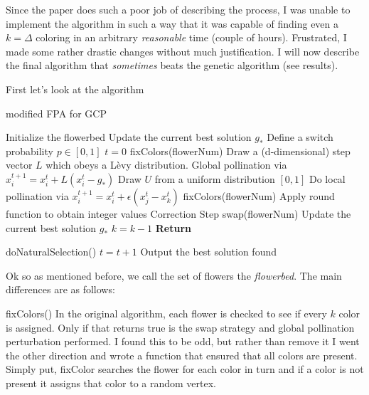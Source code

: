 Since the paper does such a poor job of describing the process, I was unable to implement the algorithm in such a way that it was capable of finding even a $k = \Delta$ coloring in an arbitrary \emph{reasonable} time (couple of hours). Frustrated, I made some rather drastic changes without much justification. I will now describe the final algorithm that \emph{sometimes} beats the genetic algorithm (see results).

First let's look at the algorithm

\begin{algorithm}[H]
    \caption{modified FPA for GCP}
    \label{FPA2}
    \begin{algorithmic}[1] %
         			
			\State Initialize the flowerbed
			\State Update the current best solution $g_*$
			\State Define a switch probability $p \in [0,1]$
			\State $t=0$
					\State fixColors(flowerNum)
					 
						\State Draw a (d-dimensional) step vector $L$ which obeys a L\`evy distribution.
						\State Global pollination via $x_i^{t+1} = x_i^{t} + L(x_i^{t} - g_*)$
					\Else
						\State Draw $U$ from a uniform distribution $[0,1]$
						\State Do local pollination via $x_i^{t+1} = x_i^{t} + \epsilon(x_j^{t} - x_k^{t})$
					\EndIf
					\State fixColors(flowerNum)
					\State Apply round function to obtain integer values
					\State Correction Step 
					 
						\State swap(flowerNum)
					\EndFor
				\EndFor
				\State Update the current best solution $g_*$
					\State $k = k-1$
					\State \textbf{Return}
				\EndIf

				doNaturalSelection()
				\State $t = t+1$
			\EndWhile
			\State Output the best solution found
		\EndProcedure
    \end{algorithmic}
\end{algorithm}

Ok so as mentioned before, we call the set of flowers the \emph{flowerbed}. The main differences are as follows:

fixColors()
In the original algorithm, each flower is checked to see if every $k$ color is assigned. Only if that returns true is the swap strategy and global pollination perturbation performed. I found this to be odd, but rather than remove it I went the other direction and wrote a function that ensured that all colors are present. Simply put, fixColor searches the flower for each color in turn and if a color is not present it assigns that color to a random vertex.

